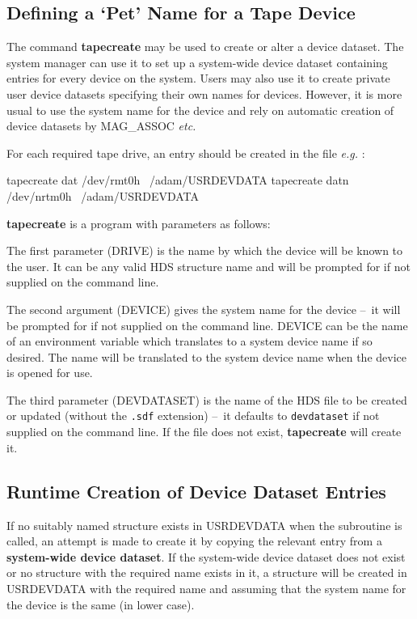 \documentclass[11pt]{starlink}
\providecommand{\dash}{--}
\begin{document}
\subsection{\label{tapecreate}Defining a `Pet' Name for a
Tape Device}
The command \textbf{tapecreate} may be used to create or alter a device dataset.
The system manager can use it to set up a system-wide device dataset
containing entries for every device on the system. Users may also use it to
create private user device datasets specifying their own names for devices.
However, it is more usual to use the system name for the device and rely on
automatic creation of device datasets by MAG\_ASSOC \emph{etc.}

For each required tape drive, an entry should be created in the file
\emph{e.g.} :
\begin{small}
\begin{terminalv}
tapecreate dat /dev/rmt0h ~/adam/USRDEVDATA
tapecreate datn /dev/nrtm0h ~/adam/USRDEVDATA
\end{terminalv}
\end{small}

\textbf{tapecreate} is a
program with parameters as follows:

The first parameter (DRIVE) is the name by which the device will be known to
the user. It can be any valid HDS structure name and will be prompted for if
not supplied on the command line.

The second argument (DEVICE) gives the system name for the device \dash\ it
will be prompted for if not supplied on the command line.
DEVICE can be the name of an environment variable which translates to a
system device name if so desired. The name will be translated to the
system device name when the device is opened for use.

The third parameter (DEVDATASET) is the name of the HDS file to be created or
updated (without the {\tt.sdf} extension) \dash\ it defaults to
\texttt{devdataset} if not supplied on the command line.
If the file does not exist, \textbf{tapecreate} will create it.

\subsection{Runtime Creation of Device Dataset Entries}
If no suitably named structure exists in USRDEVDATA when the
subroutine is called, an attempt is made to create it by copying the relevant
entry from a \textbf{system-wide device dataset}.
If the system-wide device dataset does not exist or no structure with the
required name exists in it, a structure will be created in USRDEVDATA with
the required name and assuming that the system name for the device is the same
(in lower case).
\end{document}
